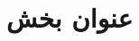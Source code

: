 \documentclass[a4paper,12pt,fullpage]{article}
\begin{document}
	 
	\pagebreak
	\tableofcontents
	\pagebreak
	\listoftables
	\pagebreak
	\listoffigures
	\pagebreak
\section{عنوان بخش}
	
\pagebreak

%
\end{document}
